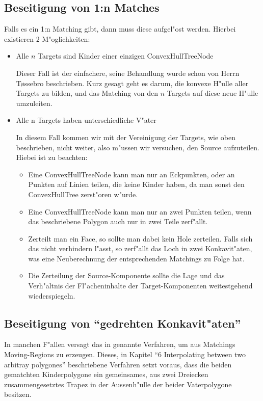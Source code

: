 \subsection{Beseitigung von 1:n Matches}

Falls es ein 1:n Matching gibt, dann muss diese aufgel"ost werden. Hierbei existieren 2 M"oglichkeiten:
\begin{itemize}
\item Alle $n$ Targets sind Kinder einer einzigen ConvexHullTreeNode

Dieser Fall ist der einfachere, seine Behandlung wurde schon von Herrn T\o{}ssebro beschrieben. Kurz gesagt geht es darum, die konvexe H"ulle aller Targets zu bilden, und das Matching von den $n$ Targets auf diese neue H"ulle umzuleiten.

\item Alle n Targets haben unterschiedliche V"ater

In diesem Fall kommen wir mit der Vereinigung der Targets, wie oben beschrieben, nicht weiter, also m"ussen wir versuchen, den Source aufzuteilen. Hiebei ist zu beachten:
\begin{itemize}
\item Eine ConvexHullTreeNode kann man nur an Eckpunkten, oder an Punkten auf Linien teilen, die keine Kinder haben, da man sonst den ConvexHullTree zerst"oren w"urde.

\item Eine ConvexHullTreeNode kann man nur an zwei Punkten teilen, wenn das beschriebene Polygon auch nur in zwei Teile zerf"allt.
\item Zerteilt man ein Face, so sollte man dabei kein Hole zerteilen. Falls sich das nicht verhindern l"asst, so zerf"allt das Loch in zwei Konkavit"aten, was eine Neuberechnung der entsprechenden Matchings zu Folge hat.

\item Die Zerteilung der Source-Komponente sollte die Lage und das Verh"altnis der Fl"acheninhalte der Target-Komponenten weitestgehend wiederspiegeln.

\end{itemize} 
\end{itemize} 
\subsection{Beseitigung von "`gedrehten Konkavit"aten"'}
In manchen F"allen versagt das in \cite{TG} genannte Verfahren, um aus Matchings Moving-Regions zu erzeugen. Dieses, in Kapitel "`6 Interpolating between two arbitray polygones"' beschriebene Verfahren setzt voraus, dass die beiden gematchten Kinderpolygone ein gemeinsames, aus zwei Dreiecken zusammengesetztes Trapez in der Aussenh"ulle der beider Vaterpolygone besitzen. 


